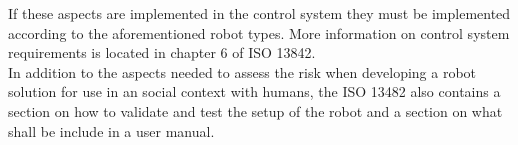 If these aspects are implemented in the control system they must be implemented according to the aforementioned robot types. More information on control system requirements is located in chapter 6 of ISO 13842.\cite{ISO13842}\\

In addition to the aspects needed to assess the risk when developing a robot solution for use in an social context with humans, the ISO 13482 also contains a section on how to validate and test the setup of the robot and a section on what shall be include in a user manual.
